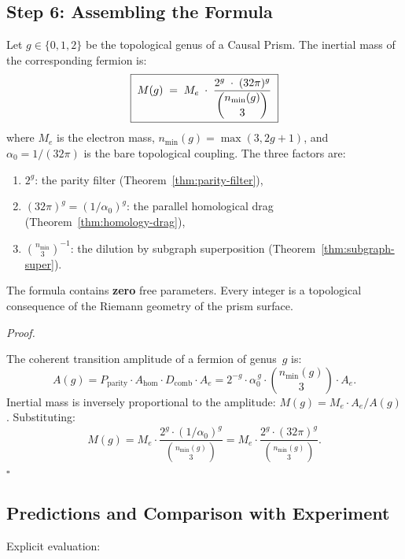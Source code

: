 \documentclass[11pt, a4paper, openany]{book}
\newcounter{thm}[chapter]
\renewenvironment{proof}[1][Proof]{%
  \par\noindent\textit{#1.}\quad
}{\hfill$\square$\par\medskip}
\begin{document}
\subsection{Step 6: Assembling the Formula}

\begin{theorem}
\label{thm:mass-formula}
Let $g \in \{0, 1, 2\}$ be the topological genus of a Causal Prism.
The inertial mass of the corresponding fermion is:
\begin{equation}
  \boxed{\;
  M(g) \;=\; M_e \;\cdot\;
  \frac{2^g \;\cdot\; (32\pi)^g}
       {\dbinom{n_{\min}(g)}{3}}
  \;}
  \label{eq:mass-formula}
\end{equation}
where $M_e$ is the electron mass, $n_{\min}(g) = \max(3, 2g+1)$,
and $\alpha_0 = 1/(32\pi)$ is the bare topological coupling.
The three factors are:
\begin{enumerate}
  \item $2^g$: the parity filter
        (Theorem~\ref{thm:parity-filter}),
  \item $(32\pi)^g = (1/\alpha_0)^g$: the parallel homological
        drag (Theorem~\ref{thm:homology-drag}),
  \item $\binom{n_{\min}}{3}^{-1}$: the dilution by subgraph
        superposition (Theorem~\ref{thm:subgraph-super}).
\end{enumerate}
The formula contains \textbf{zero} free parameters. Every
integer is a topological consequence of the Riemann geometry
of the prism surface.
\end{theorem}

\begin{proof}
The coherent transition amplitude of a fermion of genus~$g$
is:
\[
  A(g) = P_{\mathrm{parity}} \cdot A_{\mathrm{hom}} \cdot
         D_{\mathrm{comb}} \cdot A_e
       = 2^{-g} \cdot \alpha_0^{\,g} \cdot
         \binom{n_{\min}(g)}{3} \cdot A_e.
\]
Inertial mass is inversely proportional to the amplitude:
$M(g) = M_e \cdot A_e / A(g)$. Substituting:
\[
  M(g) = M_e \cdot \frac{2^g \cdot (1/\alpha_0)^g}
              {\binom{n_{\min}(g)}{3}}
       = M_e \cdot \frac{2^g \cdot (32\pi)^g}
              {\binom{n_{\min}(g)}{3}}.
\]
\end{proof}

\subsection{Predictions and Comparison with Experiment}

\noindent Explicit evaluation:
\end{document}
